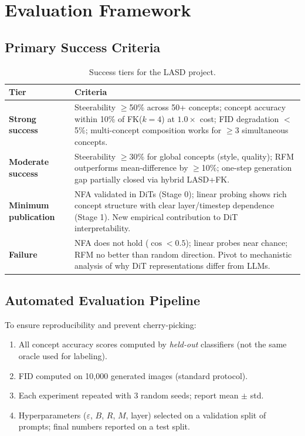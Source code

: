 \documentclass[11pt]{article}
\begin{document}
\section{Evaluation Framework}
\label{sec:evaluation}

\subsection{Primary Success Criteria}

\begin{table}[h]
\centering
\caption{Success tiers for the LASD project.}
\label{tab:success}
\begin{tabular}{lp{9cm}}
\toprule
\textbf{Tier} & \textbf{Criteria} \\
\midrule
\textbf{Strong success} & Steerability $\geq$50\% across 50+ concepts; concept accuracy within 10\% of FK($k=4$) at $1.0\times$ cost; FID degradation $<$5\%; multi-concept composition works for $\geq$3 simultaneous concepts. \\[4pt]
\textbf{Moderate success} & Steerability $\geq$30\% for global concepts (style, quality); RFM outperforms mean-difference by $\geq$10\%; one-step generation gap partially closed via hybrid LASD+FK. \\[4pt]
\textbf{Minimum publication} & NFA validated in DiTs (Stage 0); linear probing shows rich concept structure with clear layer/timestep dependence (Stage 1). New empirical contribution to DiT interpretability. \\[4pt]
\textbf{Failure} & NFA does not hold ($\cos < 0.5$); linear probes near chance; RFM no better than random direction. Pivot to mechanistic analysis of why DiT representations differ from LLMs. \\
\bottomrule
\end{tabular}
\end{table}

\subsection{Automated Evaluation Pipeline}

To ensure reproducibility and prevent cherry-picking:
\begin{enumerate}[leftmargin=*]
    \item All concept accuracy scores computed by \emph{held-out} classifiers (not the same oracle used for labeling).
    \item FID computed on 10,000 generated images (standard protocol).
    \item Each experiment repeated with 3 random seeds; report mean $\pm$ std.
    \item Hyperparameters ($\varepsilon$, $B$, $R$, $M$, layer) selected on a validation split of prompts; final numbers reported on a test split.
\end{enumerate}
\end{document}

